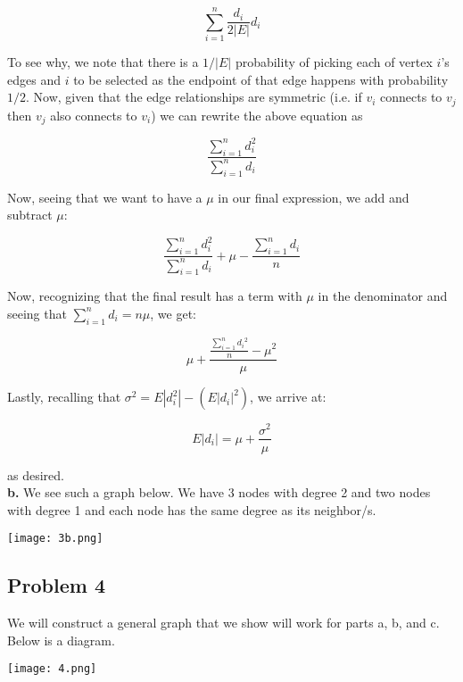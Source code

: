 \documentclass[12 pt]{article}
\begin{document}
	\begin{equation}
	 \sum_{i=1}^n \frac{d_i}{2|E|} d_i 
	\end{equation}
	
	\noindent To see why, we note that there is a $1/|E|$ probability of picking each of vertex $i$'s edges and $i$ to be selected as the endpoint of that edge happens with probability $1/2$. Now, given that the edge relationships are symmetric (i.e. if $v_i$ connects to $v_j$ then $v_j$ also connects to $v_i$) we can rewrite the above equation as 
	
	\begin{equation}
		\frac{\sum_{i=1}^n d_i^2}{\sum_{i=1}^n d_i}
	\end{equation}
	
	\noindent Now, seeing that we want to have a $\mu$ in our final expression, we add and subtract $\mu$:
	
	\begin{equation}
	\frac{\sum_{i=1}^n d_i^2}{\sum_{i=1}^n d_i} + \mu - \frac{\sum_{i=1}^n d_i}{n} 
	\end{equation}
	
	\noindent Now, recognizing that the final result has a term with $\mu$ in the denominator and seeing that $\sum_{i=1}^n d_i = n \mu$, we get:
	
	\begin{equation}
	\mu + \frac{\frac{\sum_{i=1}^n {d_i}^2}{n} - \mu ^2}{\mu}
	\end{equation}
	
	\noindent Lastly, recalling that $\sigma^2 = E|d_i^2| - (E|d_i|^2)$, we arrive at:
	
	\begin{equation}
	E|d_i| = \mu + \frac{\sigma ^2} {\mu}
	\end{equation}
	
	\noindent as desired.\\
	
	\noindent \textbf{b.} We see such a graph below. We have 3 nodes with degree 2 and two nodes with degree 1 and each node has the same degree as its neighbor/s.
	\begin{center}
	\texttt{[image: 3b.png]} 
	\end{center}
	
	\subsection*{Problem 4}
	\noindent We will construct a general graph that we show will work for parts a, b, and c. Below is a diagram.
	\begin{center}
	\texttt{[image: 4.png]}
	\end{center}
\end{document}
